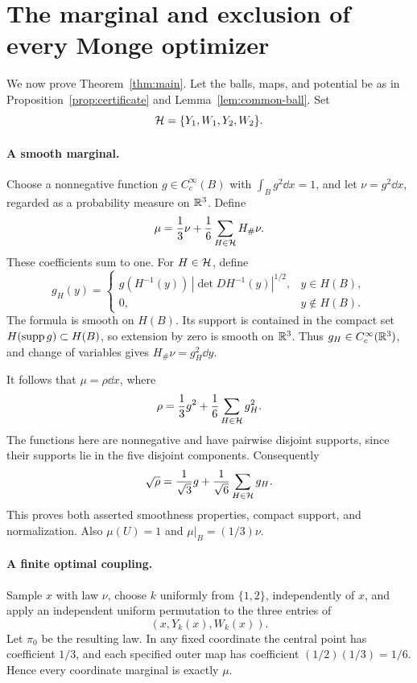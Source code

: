 \section{The marginal and exclusion of every Monge optimizer}
\label{sec:proof}

We now prove Theorem~\ref{thm:main}. Let the balls, maps, and
potential be as in Proposition~\ref{prop:certificate} and
Lemma~\ref{lem:common-ball}. Set
\[
 \mathcal H=\{Y_1,W_1,Y_2,W_2\}.
\]

\paragraph{A smooth marginal.}
Choose a nonnegative function \(g\in C_c^\infty(B)\) with
\(\int_Bg^2\dd x=1\), and let
\(\nu=g^2\dd x\), regarded as a probability measure on \(\mathbb R^3\).
Define
\begin{equation}\label{eq:mu}
 \mu=\frac13\nu+\frac16\sum_{H\in\mathcal H}H_\#\nu.
\end{equation}
These coefficients sum to one. For \(H\in\mathcal H\), define
\[
 g_H(y)=
 \begin{cases}
  g(H^{-1}(y))\,|\det DH^{-1}(y)|^{1/2},&y\in H(B),\\
  0,&y\notin H(B).
 \end{cases}
\]
The formula is smooth on \(H(B)\). Its support is contained in
the compact set \(H(\operatorname{supp} g)\subset H(B)\), so extension by zero
is smooth on \(\mathbb R^3\). Thus \(g_H\in C_c^\infty(\mathbb R^3)\), and
change of variables gives \(H_\#\nu=g_H^2\dd y\).

It follows that \(\mu=\rho\dd x\), where
\[
 \rho=\frac13g^2+\frac16\sum_{H\in\mathcal H}g_H^2.
\]
The functions here are nonnegative and have pairwise disjoint
supports, since their supports lie in the five disjoint
components. Consequently
\[
 \sqrt{\rho}=\frac1{\sqrt3}g
                +\frac1{\sqrt6}\sum_{H\in\mathcal H}g_H.
\]
This proves both asserted smoothness properties, compact support,
and normalization. Also \(\mu(U)=1\) and
\(\mu|_B=(1/3)\nu\).

\paragraph{A finite optimal coupling.}
Sample \(x\) with law \(\nu\), choose \(k\) uniformly from
\(\{1,2\}\), independently of \(x\), and apply an independent
uniform permutation to the three entries of
\[
 (x,Y_k(x),W_k(x)).
\]
Let \(\pi_0\) be the resulting law.
In any fixed coordinate the central point has coefficient \(1/3\),
and each specified outer map has coefficient
\((1/2)(1/3)=1/6\). Hence every coordinate marginal is exactly
\(\mu\).

